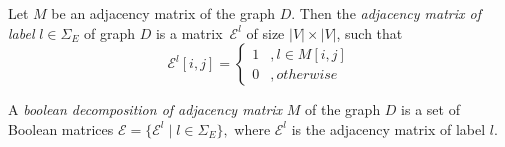 \begin{definition}
Let $M$ be an adjacency matrix of the graph $D$. Then the \emph{adjacency matrix of label} $l \in \Sigma_E$ of graph $D$ is a matrix~$\mathcal{E}^l$ of size  $|V| \times |V|$, such that
\begin{equation*}
\mathcal{E}^l[i,j] =
 \begin{cases}
   1 &, l \in M[i,j]\\
   0 &, otherwise
 \end{cases}
\end{equation*} 
\end{definition}

\begin{definition}
A \emph{boolean decomposition of adjacency matrix} $M$ of the graph $D$ is a set of Boolean matrices $\mathcal{E} = \{\mathcal{E}^l \mid l \in \Sigma_E\},$
where $\mathcal{E}^l$ is the adjacency matrix of label $l$. 
\end{definition}

